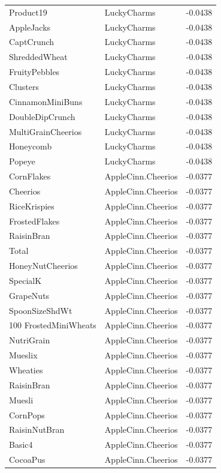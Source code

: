 \begin{longtable}{llr}
Product19 & LuckyCharms & -0.0438 \\
AppleJacks & LuckyCharms & -0.0438 \\
CaptCrunch & LuckyCharms & -0.0438 \\
ShreddedWheat & LuckyCharms & -0.0438 \\
FruityPebbles & LuckyCharms & -0.0438 \\
Clusters & LuckyCharms & -0.0438 \\
CinnamonMiniBuns & LuckyCharms & -0.0438 \\
DoubleDipCrunch & LuckyCharms & -0.0438 \\
MultiGrainCheerios & LuckyCharms & -0.0438 \\
Honeycomb & LuckyCharms & -0.0438 \\
Popeye & LuckyCharms & -0.0438 \\
CornFlakes & AppleCinn.Cheerios & -0.0377 \\
Cheerios & AppleCinn.Cheerios & -0.0377 \\
RiceKrispies & AppleCinn.Cheerios & -0.0377 \\
FrostedFlakes & AppleCinn.Cheerios & -0.0377 \\
RaisinBran & AppleCinn.Cheerios & -0.0377 \\
Total & AppleCinn.Cheerios & -0.0377 \\
HoneyNutCheerios & AppleCinn.Cheerios & -0.0377 \\
SpecialK & AppleCinn.Cheerios & -0.0377 \\
GrapeNuts & AppleCinn.Cheerios & -0.0377 \\
SpoonSizeShdWt & AppleCinn.Cheerios & -0.0377 \\
100%
FrostedMiniWheats & AppleCinn.Cheerios & -0.0377 \\
NutriGrain & AppleCinn.Cheerios & -0.0377 \\
Mueslix & AppleCinn.Cheerios & -0.0377 \\
Wheaties & AppleCinn.Cheerios & -0.0377 \\
RaisinBran & AppleCinn.Cheerios & -0.0377 \\
Muesli & AppleCinn.Cheerios & -0.0377 \\
CornPops & AppleCinn.Cheerios & -0.0377 \\
RaisinNutBran & AppleCinn.Cheerios & -0.0377 \\
Basic4 & AppleCinn.Cheerios & -0.0377 \\
CocoaPus & AppleCinn.Cheerios & -0.0377 \\

\end{longtable}
